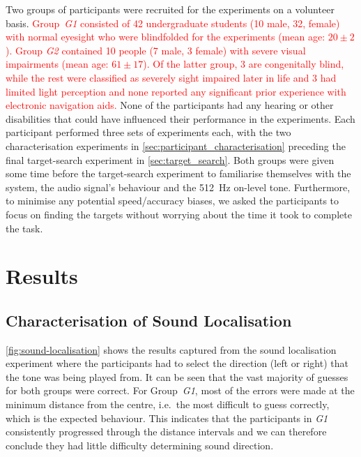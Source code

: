 \documentclass[acmsmall]{acmart}
\newcommand\hl[1]{\textcolor{red}{#1}}
\begin{document}
Two groups of participants were recruited for the experiments on a volunteer basis. 
\hl{Group~\textit{G1} consisted of 42 undergraduate students (10 male, 32, female) with normal eyesight who were blindfolded for the experiments (mean age: $20\pm2$).
Group \textit{G2} contained 10 people (7 male, 3 female) with severe visual impairments (mean age: $61\pm17$).
Of the latter group, 3 are congenitally blind, while the rest were classified as severely sight impaired later in life and 3 had limited light perception and none reported any significant prior experience with electronic navigation aids. }
None of the participants had any hearing or other disabilities that could have influenced their performance in the experiments.
Each participant performed three sets of experiments each, with the two characterisation experiments in \cref{sec:participant_characterisation} preceding the final target-search experiment in \cref{sec:target_search}. 
Both groups were given some time before the target-search experiment to familiarise themselves with the system, the audio signal's behaviour and the \SI{512}{\hertz} on-level tone. 
Furthermore, to minimise any potential speed/accuracy biases, we asked the participants to focus on finding the targets without worrying about the time it took to complete the task. 

\section{Results}\label{sec:results}

\subsection{Characterisation of Sound Localisation}

\cref{fig:sound-localisation} shows the results captured from the sound localisation experiment where the participants had to select the direction (left or right) that the tone was being played from. 
It can be seen that the vast majority of guesses for both groups were correct.
For Group~\textit{G1}, most of the errors were made at the minimum distance from the centre, i.e.\ the most difficult to guess correctly, which is the expected behaviour.
This indicates that the participants in \textit{G1} consistently progressed through the distance intervals and we can therefore conclude they had little difficulty determining sound direction.
\end{document}
